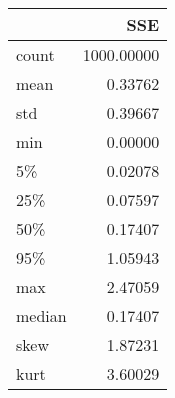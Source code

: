 \begin{tabular}{lr}
\toprule
{} &     SSE \\
\midrule
count  &  1000.00000 \\
mean   &     0.33762 \\
std    &     0.39667 \\
min    &     0.00000 \\
5\%     &     0.02078 \\
25\%    &     0.07597 \\
50\%    &     0.17407 \\
95\%    &     1.05943 \\
max    &     2.47059 \\
median &     0.17407 \\
skew   &     1.87231 \\
kurt   &     3.60029 \\
\bottomrule
\end{tabular}
